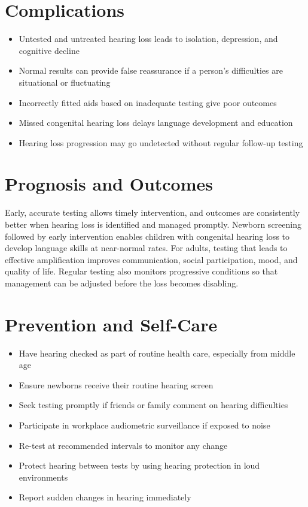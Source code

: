 \section*{Complications}
\begin{itemize}
    \item Untested and untreated hearing loss leads to isolation, depression, and cognitive decline
    \item Normal results can provide false reassurance if a person's difficulties are situational or fluctuating
    \item Incorrectly fitted aids based on inadequate testing give poor outcomes
    \item Missed congenital hearing loss delays language development and education
    \item Hearing loss progression may go undetected without regular follow-up testing
\end{itemize}

\section*{Prognosis and Outcomes}
Early, accurate testing allows timely intervention, and outcomes are consistently better when hearing loss is identified and managed promptly. Newborn screening followed by early intervention enables children with congenital hearing loss to develop language skills at near-normal rates. For adults, testing that leads to effective amplification improves communication, social participation, mood, and quality of life. Regular testing also monitors progressive conditions so that management can be adjusted before the loss becomes disabling.

\section*{Prevention and Self-Care}
\begin{itemize}
    \item Have hearing checked as part of routine health care, especially from middle age
    \item Ensure newborns receive their routine hearing screen
    \item Seek testing promptly if friends or family comment on hearing difficulties
    \item Participate in workplace audiometric surveillance if exposed to noise
    \item Re-test at recommended intervals to monitor any change
    \item Protect hearing between tests by using hearing protection in loud environments
    \item Report sudden changes in hearing immediately
\end{itemize}


